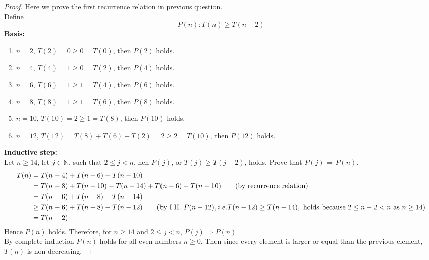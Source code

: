 \documentclass[11pt]{article}
\theoremstyle{plain}%
\theoremstyle{definition}
\theoremstyle{remark}
\newcommand{\N}{\mathbb{N}}
\begin{document}
\begin{enumerate}
  \begin{proof}
    Here we prove the first recurrence relation in previous question.
    $ $\\
    Define
    \[
      P(n): T(n) \geq T(n-2)
    \]
    \textbf{Basis:}\\
    \begin{enumerate}
      \item $n=2$, $T(2) = 0 \geq 0 = T(0)$, then $P(2)$ holds.
      \item $n=4$, $T(4) = 1 \geq 0 = T(2)$, then $P(4)$ holds.
      \item $n=6$, $T(6) = 1 \geq 1 = T(4)$, then $P(6)$ holds.
      \item $n=8$, $T(8) = 1 \geq 1 = T(6)$, then $P(8)$ holds.
      \item $n=10$, $T(10) = 2 \geq 1 = T(8)$, then $P(10)$ holds.
      \item $n=12$, $T(12) = T(8) + T(6) - T(2) = 2 \geq 2 = T(10)$, then $P(12)$ holds.
    \end{enumerate}
    \textbf{Inductive step:}\\
    Let $n\geq 14$, let $j\in\N$, such that $2\leq j<n$, hen $P(j)$, or $T(j) \geq T(j-2)$, holds. Prove that $P(j) \Rightarrow P(n)$.
    \begin{align*}
      T(n) &= T(n-4) + T(n-6) - T(n-10)\\
      &= T(n-8) + T(n-10) - T(n-14) + T(n-6) - T(n-10)\tag{by recurrence relation}\\
      &= T(n-6) + T(n-8) - T(n-14) \\
      &\geq T(n-6) + T(n-8) - T(n-12) \tag{by I.H. $P(n-12), i.e. T(n-12)\geq T(n-14), \text{ holds because } 2\leq n-2 < n \text{ as } n\geq 14$}\\
      &= T(n-2)
     \end{align*}
     Hence $P(n)$ holds. Therefore, for $n\geq 14$ and $2\leq j<n$, $P(j)\Rightarrow P(n)$\\
     By complete induction $P(n)$ holds for all even numbers $n\geq 0$. Then since every element is larger or equal than the previous element, $T(n)$ is non-decreasing.

  \end{proof}
  \end{enumerate}
\end{document}
